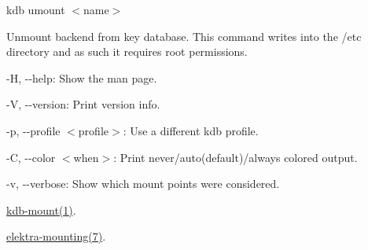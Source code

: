 {\ttfamily kdb umount $<$name$>$}

Unmount backend from key database. This command writes into the {\ttfamily /etc} directory and as such it requires root permissions.


\begin{DoxyItemize}
\item {\ttfamily -\/H}, {\ttfamily -\/-\/help}\+: Show the man page.
\item {\ttfamily -\/V}, {\ttfamily -\/-\/version}\+: Print version info.
\item {\ttfamily -\/p}, {\ttfamily -\/-\/profile $<$profile$>$}\+: Use a different kdb profile.
\item {\ttfamily -\/C}, {\ttfamily -\/-\/color $<$when$>$}\+: Print never/auto(default)/always colored output.
\item {\ttfamily -\/v}, {\ttfamily -\/-\/verbose}\+: Show which mount points were considered.
\end{DoxyItemize}


\begin{DoxyItemize}
\item \mbox{\hyperlink{doc_help_kdb-mount_md}{kdb-\/mount(1)}}.
\item \mbox{\hyperlink{doc_help_elektra-mounting_md}{elektra-\/mounting(7)}}. 
\end{DoxyItemize}